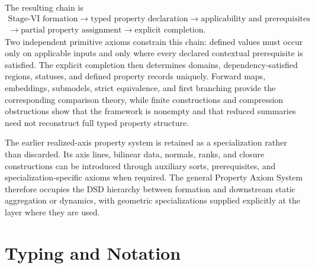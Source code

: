 \documentclass[11pt]{article}
\theoremstyle{definition}
\theoremstyle{remark}
\begin{document}
The resulting chain is
\[
\begin{gathered}
\text{Stage-VI formation}
\longrightarrow
\text{typed property declaration}
\longrightarrow
\text{applicability and prerequisites}\\
\longrightarrow
\text{partial property assignment}
\longrightarrow
\text{explicit completion}.
\end{gathered}
\]
Two independent primitive axioms constrain this chain: defined values must occur only on applicable inputs and only where every declared contextual prerequisite is satisfied.
The explicit completion then determines domains, dependency-satisfied regions, statuses, and defined property records uniquely.
Forward maps, embeddings, submodels, strict equivalence, and first branching provide the corresponding comparison theory, while finite constructions and compression obstructions show that the framework is nonempty and that reduced summaries need not reconstruct full typed property structure.

The earlier realized-axis property system is retained as a specialization rather than discarded.
Its axis lines, bilinear data, normals, ranks, and closure constructions can be introduced through auxiliary sorts, prerequisites, and specialization-specific axioms when required.
The general Property Axiom System therefore occupies the DSD hierarchy between formation and downstream static aggregation or dynamics, with geometric specializations supplied explicitly at the layer where they are used.

\appendix
\section{Typing and Notation}
\label{app:notation}
\end{document}
